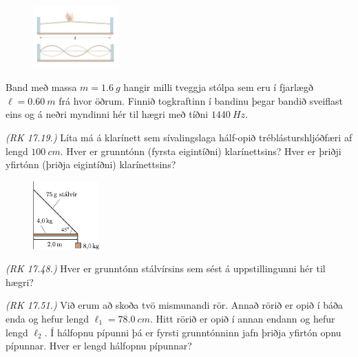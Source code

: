 \begin{enumerate}[label = \textbf{Dæmi \thechapter.\arabic*.}]
\begin{minipage}{\linewidth}
\end{minipage}

\begin{minipage}{\linewidth}

\begin{figure}
\vspace{-1cm}
\includegraphics[width = 1.3in]{images/plokkun.png}
\end{figure}

\item Band með massa $m = \SI{1.6}{g}$ hangir milli tveggja stólpa sem eru í fjarlægð $\ell = \SI{0.60}{m}$ frá hvor öðrum. Finnið togkraftinn í bandinu þegar bandið sveiflast eins og á neðri myndinni hér til hægri með tíðni $\SI{1440}{Hz}$.

\item \textit{(RK 17.19.)} Líta má á klarínett sem sívalingslaga hálf-opið tréblásturshljóðfæri af lengd $\SI{100}{cm}$. Hver er grunntónn (fyrsta eigintíðni) klarínettsins? Hver er þriðji yfirtónn (þriðja eigintíðni) klarínettsins?

\end{minipage}

\begin{minipage}{\linewidth}

\begin{figure}
\vspace{-0.5cm}
\includegraphics[width = 1in]{figures/copybest.pdf}
\end{figure}

\item \textit{(RK 17.48.)} Hver er grunntónn stálvírsins sem sést á uppstillingunni hér til hægri?

\item \textit{(RK 17.51.)} Við erum að skoða tvö mismunandi rör. Annað rörið er opið í báða enda og hefur lengd $\ell_1 = \SI{78.0}{cm}$. Hitt rörið er opið í annan endann og hefur lengd $\ell_2$. Í hálfopnu pípunni þá er fyrsti grunntónninn jafn þriðja yfirtón opnu pípunnar. Hver er lengd hálfopnu pípunnar?


\end{minipage}

\end{enumerate}

